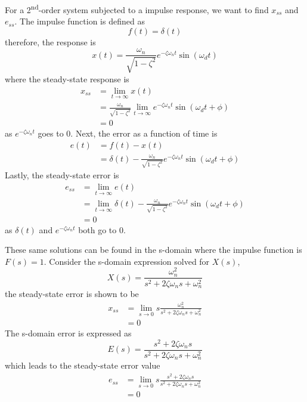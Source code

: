 \documentclass[12pt,letter]{article}
\numberwithin{ex}{section} %
\numberwithin{re}{section} %
\numberwithin{equation}{section}	%
\begin{document}
For a 2\textsuperscript{nd}-order system subjected to a impulse response, we want to find $x_{ss}$ and $e_{ss}$. The impulse function is defined as
\begin{equation}
f(t) = \delta(t)
\end{equation}
therefore, the response is
\begin{equation}
x(t) = \frac{\omega_n}{\sqrt{1-\zeta^2}} e ^{-\zeta \omega_n t} \sin(\omega_d t)
\end{equation}
where the steady-state response is
\begin{align}
x_{ss} &= \lim\limits_{t \rightarrow \infty} x(t)\\
&= \frac{\omega_n}{\sqrt{1-\zeta^2}}  \lim\limits_{t \rightarrow \infty}  e^{-\zeta \omega_n t} \sin (\omega_d t + \phi) \nonumber \\
&=  0 \nonumber
\end{align}
as $e^{-\zeta \omega_n t} $ goes to 0. Next, the error as a function of time is 
\begin{align}
e(t) &= f(t) - x(t) \\
&= \delta (t) - \frac{\omega_n}{\sqrt{1-\zeta^2}} e^{-\zeta \omega_n t} \sin (\omega_d t + \phi) \nonumber
\end{align}
Lastly, the steady-state error is
\begin{align}
e_{ss} &= \lim\limits_{t \rightarrow \infty} e(t) \\
&= \lim\limits_{t \rightarrow \infty} \delta (t) - \frac{\omega_n}{\sqrt{1-\zeta^2}} e^{-\zeta \omega_n t} \sin (\omega_d t + \phi) \nonumber \\
&= 0 \nonumber
\end{align}
as $\delta(t)$ and $e^{-\zeta \omega_n t}$ both go to 0. 

These same solutions can be found in the s-domain where the impulse function is $F(s)=1$. Consider the s-domain expression solved for $X(s)$, 
\begin{equation}
X(s) = \frac{\omega_n^2}{s^2 + 2 \zeta \omega_n s + \omega_n^2} 
\end{equation}
the steady-state error is shown to be
\begin{align}
x_{ss} &= \lim\limits_{s \rightarrow 0} s \frac{\omega_n^2}{s^2 + 2 \zeta \omega_n s + \omega_n^2}  \\
&= 0    \nonumber 
\end{align}
The s-domain error is expressed as
\begin{equation}
E(s) = \frac{s^2 + 2 \zeta \omega_n s}{s^2 + 2 \zeta \omega_n s + \omega_n^2}
\end{equation}
which leads to the steady-state error value
\begin{align}
e_{ss} &= \lim\limits_{s \rightarrow 0}  s \frac{s^2 + 2 \zeta \omega_n s}{s^2 + 2 \zeta \omega_n s + \omega_n^2} \\
&= 0   \nonumber 
\end{align}
\end{document}
